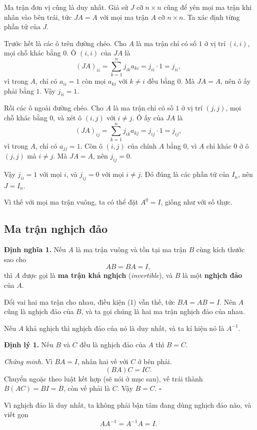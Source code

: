 \documentclass[12pt,a4paper]{article}
\begin{document}
Ma trận đơn vị cũng là duy nhất. Giả sử \(J\) cỡ \(n\times n\) cũng để yên mọi ma trận khi nhân vào bên trái, tức \(JA=A\) với mọi ma trận \(A\) cỡ \(n\times n\). Ta xác định từng phần tử của \(J\).

Trước hết là các ô trên đường chéo. Cho \(A\) là ma trận chỉ có số \(1\) ở vị trí \((i,i)\), mọi chỗ khác bằng \(0\). Ô \((i,i)\) của \(JA\) là
$$
(JA)_{ii}=\sum_{k=1}^{n}j_{ik}a_{ki}=j_{ii}\cdot 1=j_{ii},
$$
vì trong \(A\), chỉ có \(a_{ii}=1\) còn mọi \(a_{ki}\) với \(k\neq i\) đều bằng \(0\). Mà \(JA=A\), nên ô ấy phải bằng \(1\). Vậy \(j_{ii}=1\).

Rồi các ô ngoài đường chéo. Cho \(A\) là ma trận chỉ có số \(1\) ở vị trí \((j,j)\), mọi chỗ khác bằng \(0\), và xét ô \((i,j)\) với \(i\neq j\). Ô ấy của \(JA\) là
$$
(JA)_{ij}=\sum_{k=1}^{n}j_{ik}a_{kj}=j_{ij}\cdot 1=j_{ij},
$$
vì trong \(A\), chỉ có \(a_{jj}=1\). Còn ô \((i,j)\) của chính \(A\) bằng \(0\), vì \(A\) chỉ khác \(0\) ở ô \((j,j)\) mà \(i\neq j\). Mà \(JA=A\), nên \(j_{ij}=0\).

Vậy \(j_{ii}=1\) với mọi \(i\), và \(j_{ij}=0\) với mọi \(i\neq j\). Đó đúng là các phần tử của \(I_n\), nên \(J=I_n\).

Vì thế với mọi ma trận vuông, ta có thể đặt \(A^0=I\), giống như với số thực.

\subsection{Ma trận nghịch đảo}

\textbf{Định nghĩa 1.} Nếu \(A\) là ma trận vuông và tồn tại ma trận \(B\) cùng kích thước sao cho
$$
AB=BA=I, \tag{1}
$$
thì \(A\) được gọi là \textbf{ma trận khả nghịch} (\emph{invertible}), và \(B\) là một \textbf{nghịch đảo} của \(A\).

Đổi vai hai ma trận cho nhau, điều kiện (1) vẫn thế, tức \(BA=AB=I\). Nên \(A\) cũng là nghịch đảo của \(B\), và ta gọi chúng là hai ma trận nghịch đảo của nhau.

Nếu \(A\) khả nghịch thì nghịch đảo của nó là duy nhất, và ta kí hiệu nó là \(A^{-1}\). 

\textbf{Định lý 1.} Nếu \(B\) và \(C\) đều là nghịch đảo của \(A\) thì \(B=C\).

\emph{Chứng minh.} Vì \(BA=I\), nhân hai vế với \(C\) ở bên phải.
$$
(BA)C=IC.
$$
Chuyển ngoặc theo luật kết hợp (sẽ nói ở mục sau), vế trái thành \(B(AC)=BI=B\), còn vế phải là \(C\). Vậy \(B=C\). \(\square\)

Vì nghịch đảo là duy nhất, ta không phải bận tâm đang dùng nghịch đảo nào, và viết gọn
$$
AA^{-1}=A^{-1}A=I. \tag{2}
$$
\end{document}
